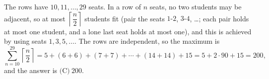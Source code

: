 The rows have $10,11,\dots,29$ seats. In a row of $n$ seats, no two students may be adjacent, so at most $\left\lceil\dfrac {n}{2}\right\rceil$ students fit (pair the seats $1\text{-}2$, $3\text{-}4$, \dots; each pair holds at most one student, and a lone last seat holds at most one), and this is achieved by using seats $1,3,5,\dots$. The rows are independent, so the maximum is
\[
\sum_{n=10}^{29}\left\lceil\dfrac {n}{2}\right\rceil=5+(6+6)+(7+7)+\cdots+(14+14)+15=5+2\cdot90+15=200,
\]
and the answer is $\boxed{\text{(C)}\ 200}$.
